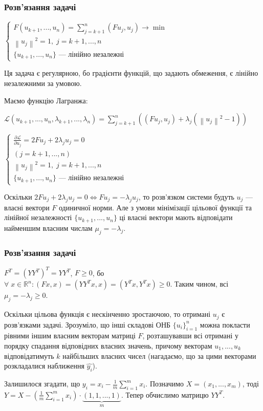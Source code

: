 \documentclass[10pt,pdf]{beamer}
\newcommand{\norm}[1]{\left\lVert#1\right\rVert} %
\newcommand{\dotprod}[2]{\left(#1, #2\right)} %
\begin{document}
    \begin{frame}
        \frametitle{Розв'язання задачі}
        $\begin{cases}
            F(u_{k+1}, ..., u_{n}) = \sum\limits_{j = k+1}^n \dotprod{F u_j}{u_j} \to \min \\
            \norm{u_j}^2 = 1, \; j = k+1, ..., n \\
            \{ u_{k+1}, ..., u_n\} \text{ --- лінійно незалежні}
        \end{cases}$

        Ця задача є регулярною, бо градієнти функцій, що задають обмеження, є лінійно незалежними за умовою.

        Маємо функцію Лагранжа: 

        $\mathcal{L}(u_{k+1}, ..., u_{n}, \lambda_{k+1}, ..., \lambda_n) = 
        \sum\limits_{j=k+1}^n\left(\dotprod{F{u_j}}{{u_j}} + 
        \lambda_j\left(\norm{{u_j}
        }^2 - 1\right)\right)$

        $
        \begin{cases}
            \frac{\partial \mathcal{L}}{\partial {u_j}} = 2F{u_j} + 2 \lambda_j {u_j} = 0 \\ 
            (j = k+1, ..., n) \\
            \norm{u_j}^2 = 1, \; j = k+1, ..., n \\
            \{ u_{k+1}, ..., u_n\} \text{ --- лінійно незалежні}
        \end{cases}
        $

        Оскільки $2F{u_j} + 2 \lambda_j {u_j} = 0 \Leftrightarrow F{u_j} = -\lambda_j {u_j}$,
        то розв'язком системи будуть $u_j$ --- власні вектори $F$ одиничної норми.
        Але з умови мінімізації цільової функції та лінійної незалежності $\{ u_{k+1}, ..., u_n\}$
        ці власні вектори мають відповідати найменшим власним числам $\mu_j = -\lambda_j$.
    \end{frame}
    \begin{frame}
        \frametitle{Розв'язання задачі}
        $F^T = (Y Y^T)^T = Y Y^T$, $F \geq 0$, бо $\forall \; x \in \mathbb{R}^n : (Fx, x) = (Y Y^T x, x) = (Y^T x, Y^T x) \geq 0$.
        Таким чином, всі $\mu_j = -\lambda_j \geq 0$.

        Оскільки цільова функція є нескінченно зростаючою, то отримані $u_j$ є розв'язками задачі.
        Зрозуміло, що інші складові ОНБ $\{{u_i}\}_{i=1}^n$ можна покласти рівними іншим власним векторам
        матриці $F$, розташувавши всі отримані у порядку спадання відповідних власних значень, причому
        векторам $u_1, ..., u_k$ відповідатимуть $k$ найбільших власних чисел (нагадаємо, що
        за цими векторами розкладалися наближення $\hat{y_i}$).
        
        Залишилося згадати, що $y_i = x_i - \frac{1}{m} \sum\limits_{i=1}^m x_i$. 
        Позначимо $X = ({x_1}, ..., {x_m})$, тоді 
        $Y = X - \left( \frac{1}{m} \sum\limits_{i=1}^m x_i\right) \cdot \underbrace{(1, 1, ..., 1)}_{m}$.
        Тепер обчислимо матрицю $Y Y^T$.
    \end{frame}
\end{document}
